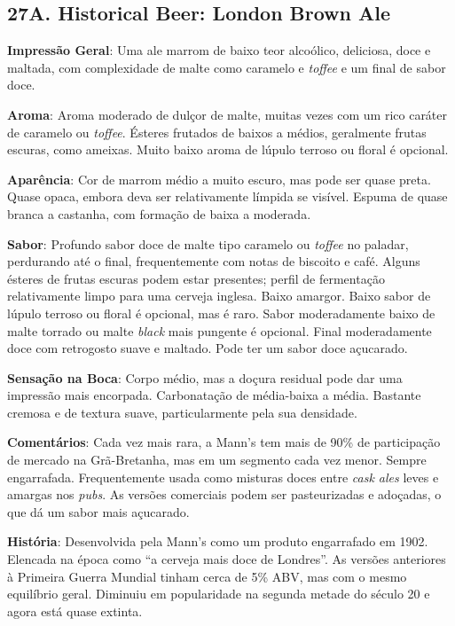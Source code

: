 \subsection*{27A. Historical Beer: London Brown Ale}
\textbf{Impressão Geral}: Uma ale marrom de baixo teor alcoólico, deliciosa, doce e maltada, com complexidade de malte como caramelo e \textit{toffee} e um final de sabor doce.

\textbf{Aroma}: Aroma moderado de dulçor de malte, muitas vezes com um rico caráter de caramelo ou \textit{toffee}. Ésteres frutados de baixos a médios, geralmente frutas escuras, como ameixas. Muito baixo aroma de lúpulo terroso ou floral é opcional.

\textbf{Aparência}: Cor de marrom médio a muito escuro, mas pode ser quase preta. Quase opaca, embora deva ser relativamente límpida se visível. Espuma de quase branca a castanha, com formação de baixa a moderada.

\textbf{Sabor}: Profundo sabor doce de malte tipo caramelo ou \textit{toffee} no paladar, perdurando até o final, frequentemente com notas de biscoito e café. Alguns ésteres de frutas escuras podem estar presentes; perfil de fermentação relativamente limpo para uma cerveja inglesa. Baixo amargor. Baixo sabor de lúpulo terroso ou floral é opcional, mas é raro. Sabor moderadamente baixo de malte torrado ou malte \textit{black} mais pungente é opcional. Final moderadamente doce com retrogosto suave e maltado. Pode ter um sabor doce açucarado.

\textbf{Sensação na Boca}: Corpo médio, mas a doçura residual pode dar uma impressão mais encorpada. Carbonatação de média-baixa a média. Bastante cremosa e de textura suave, particularmente pela sua densidade.

\textbf{Comentários}: Cada vez mais rara, a Mann's tem mais de 90\% de participação de mercado na Grã-Bretanha, mas em um segmento cada vez menor. Sempre engarrafada. Frequentemente usada como misturas doces entre \textit{cask ales} leves e amargas nos \textit{pubs}. As versões comerciais podem ser pasteurizadas e adoçadas, o que dá um sabor mais açucarado.

\textbf{História}: Desenvolvida pela Mann's como um produto engarrafado em 1902. Elencada na época como “a cerveja mais doce de Londres”. As versões anteriores à Primeira Guerra Mundial tinham cerca de 5\% ABV, mas com o mesmo equilíbrio geral. Diminuiu em popularidade na segunda metade do século 20 e agora está quase extinta.

